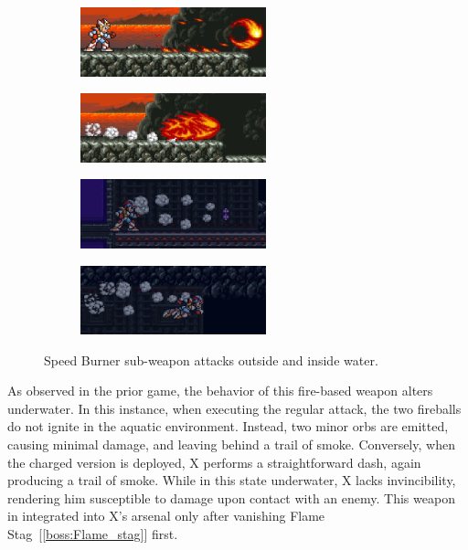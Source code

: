 \begin{figure}[htp]
	\centering
	\begin{subfigure}{0.45\linewidth}
		\centering
		\includegraphics[height=2cm]{figures/X2/weapons/S_burner_1.png}	
	\end{subfigure}
	\begin{subfigure}{0.45\linewidth}
		\centering
		\includegraphics[height=2cm]{figures/X2/weapons/S_burner_2.png}	
	\end{subfigure}
	\begin{subfigure}{0.45\linewidth}
		\centering
		\includegraphics[height=2cm]{figures/X2/weapons/S_burner_3.png}	
	\end{subfigure}
	\begin{subfigure}{0.45\linewidth}
		\centering
		\includegraphics[height=2cm]{figures/X2/weapons/S_burner_4.png}	
	\end{subfigure}
	\caption{Speed Burner sub-weapon attacks outside and inside water.}
\end{figure}

As observed in the prior game, the behavior of this fire-based weapon alters underwater. In this instance, when executing the regular attack, the two fireballs do not ignite in the aquatic environment. Instead, two minor orbs are emitted, causing minimal damage, and leaving behind a trail of smoke. Conversely, when the charged version is deployed, X performs a straightforward dash, again producing a trail of smoke. While in this state underwater, X lacks invincibility, rendering him susceptible to damage upon contact with an enemy. This weapon in integrated into X's arsenal only after vanishing Flame Stag~[\ref{boss:Flame_stag}] first.


